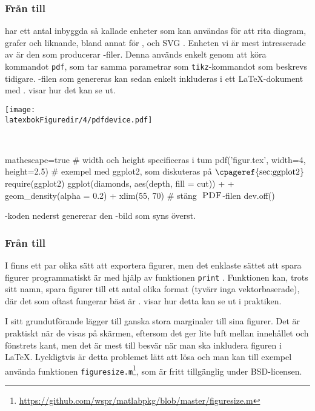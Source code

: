 \documentclass[10pt,../../a4.tex]{subfiles}
\begin{document}
\subsubsection{Från \texorpdfstring{\Rlogo}{R} till \texorpdfstring{\PDF}{PDF}}
\Rlogo har ett antal inbyggda så kallade enheter  som kan
användas för att rita diagram, grafer och liknande, bland annat för \EPS,
\PNG och \textsc{SVG} \parencite[\ppno~675–676]{RCoreTeam12}. Enheten vi är mest
intresserade av är den som producerar \PDF-filer. Denna används enkelt
genom att köra kommandot \texttt{pdf}, som tar samma parametrar som
\texttt{tikz}-kommandot som beskrevs tidigare. \PDF-filen som genereras
kan sedan enkelt inkluderas i ett \LaTeX-dokument med .
 visar hur det kan se ut.

\begin{kod}[p]
	\centering
	\begin{minipage}{\textwidth}
		\centering
		\texttt{[image: \\latexbokFiguredir/4/pdfdevice.pdf]}
	\end{minipage}
	\\[1ex]
	\begin{minipage}{\textwidth}
		\begin{rcode*}{mathescape=true}
# width och height specificeras i tum
pdf('figur.tex', width=4, height=2.5)
# exempel med ggplot2, som diskuteras på $\text{\cpageref{sec:ggplot2}}$
require(ggplot2)
ggplot(diamonds, aes(depth, fill = cut)) +
  + geom_density(alpha = 0.2) + xlim(55, 70)
# stäng $\text{\PDF}$-filen
dev.off()
		\end{rcode*}
	\end{minipage}
	\caption{\Rlogo-koden nederst genererar den \PDF-bild som
	syns överst.}
	\label{ex:pdfdevice}
\end{kod}

\subsubsection{Från \MATLAB till \PNG}
I \MATLAB finns ett par olika sätt att exportera figurer, men det
enklaste sättet att spara figurer programmatiskt är med hjälp av 
funktionen \texttt{print} \parencite{MATLAB13:print}. Funktionen kan,
trots sitt namn, spara figurer till ett antal olika format (tyvärr inga
vektorbaserade), där det som oftast fungerar bäst är \PNG.
 visar hur detta kan se ut i praktiken.

I sitt grundutförande lägger \MATLAB till ganska stora marginaler till
sina figurer. Det är praktiskt när de visas på skärmen, eftersom det ger
lite luft mellan innehållet och fönstrets kant, men det är mest till
besvär när man ska inkludera figuren i \LaTeX. Lyckligtvis är detta
problemet lätt att lösa \parencite{Robertson10} och man kan till exempel
använda funktionen \texttt{figuresize.m}\footnote{\url{https://github.com/wspr/matlabpkg/blob/master/figuresize.m}}, som är fritt tillgänglig under BSD-licensen.
\end{document}
